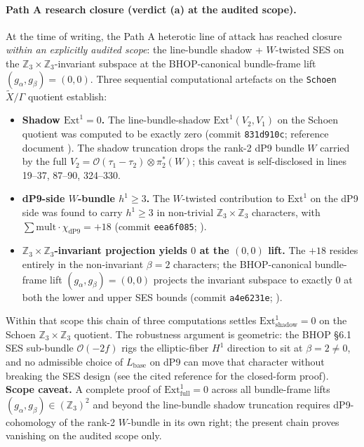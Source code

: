 ﻿\documentclass[reprint,amsmath,amssymb,aps,prd,longbibliography,floatfix]{revtex4-2}
\begin{document}
\paragraph{Path A research closure (verdict (a) at the audited scope).}
At the time of writing, the Path A heterotic line of attack has reached
closure \emph{within an explicitly audited scope}: the line-bundle
shadow + $W$-twisted SES on the $\mathbb{Z}_3 \times \mathbb{Z}_3$-invariant
subspace at the BHOP-canonical bundle-frame lift
$(g_\alpha, g_\beta) = (0, 0)$. Three sequential computational
artefacts on the \texttt{Schoen}~$\widetilde X / \Gamma$ quotient
establish:
\begin{itemize}\itemsep0pt
\item \textbf{Shadow $\mathrm{Ext}^1 = 0$.} The line-bundle-shadow
  $\mathrm{Ext}^1(V_2, V_1)$ on the Schoen quotient was computed to be
  exactly zero (commit \texttt{831d910c}; reference document
  ). The shadow
  truncation drops the rank-2 dP9 bundle $W$ carried by the full
  $V_2 = \mathcal{O}(\tau_1 - \tau_2) \otimes \pi_2^*(W)$; this caveat
  is self-disclosed in
   lines 19--37, 87--90, 324--330.
\item \textbf{dP9-side $W$-bundle $h^1 \geq 3$.} The $W$-twisted
  contribution to $\mathrm{Ext}^1$ on the dP9 side was found to carry
  $h^1 \geq 3$ in non-trivial $\mathbb{Z}_3 \times \mathbb{Z}_3$
  characters, with $\sum \mathrm{mult} \cdot \chi_\mathrm{dP9} = +18$
  (commit \texttt{eea6f085}; ).
\item \textbf{$\mathbb{Z}_3 \times \mathbb{Z}_3$-invariant projection
  yields $0$ at the $(0,0)$ lift.} The $+18$ resides entirely in the
  non-invariant $\beta = 2$ characters; the BHOP-canonical bundle-frame
  lift $(g_\alpha, g_\beta) = (0, 0)$ projects the invariant subspace
  to exactly $0$ at both the lower and upper SES bounds (commit
  \texttt{a4e6231e};
  ).
\end{itemize}
Within that scope this chain of three computations settles
$\mathrm{Ext}^1_{\mathrm{shadow}} = 0$ on the Schoen
$\mathbb{Z}_3 \times \mathbb{Z}_3$ quotient. The robustness argument
is geometric: the BHOP \S 6.1 SES sub-bundle $\mathcal{O}(-2f)$ rigs
the elliptic-fiber $H^1$ direction to sit at $\beta = 2 \neq 0$, and
no admissible choice of $L_\mathrm{base}$ on dP9 can move that
character without breaking the SES design (see the cited reference
for the closed-form proof). \textbf{Scope caveat.} A complete
proof of $\mathrm{Ext}^1_{\mathrm{full}} = 0$ across all bundle-frame
lifts $(g_\alpha, g_\beta) \in (\mathbb{Z}_3)^2$ and beyond the
line-bundle shadow truncation requires dP9-cohomology of the rank-2
$W$-bundle in its own right; the present chain proves vanishing on
the audited scope only.
\end{document}
